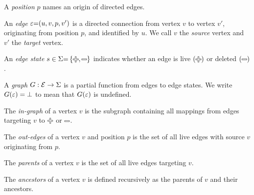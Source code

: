 \begin{definition}
  A \emph{position} $p$ names an origin of directed edges.
\end{definition}

\begin{definition}
  An \emph{edge} $\varepsilon{=}(u, v, p, v^\prime)$ is a directed connection from vertex $v$ to vertex $v'$, originating from position $p$, and identified by $u$.
  We call $v$ the \emph{source} vertex and $v'$ the \emph{target} vertex.
\end{definition}

\begin{definition}
  An \emph{edge state} $s \in \Sigma{=}\SetOf{\Plus, \Minus}$ indicates whether an edge is live $\left(\Plus\right)$ or deleted $\left(\Minus\right)$.
\end{definition}

\begin{definition}
  A \emph{graph} $G : \mathcal{E} \rightarrow \Sigma$ is a partial function from edges to edge states.
  We write $G(\varepsilon) = \bot$ to mean that $G(\varepsilon)$ is undefined.
\end{definition}

\begin{definition}
  The \emph{in-graph} of a vertex $v$ is the subgraph containing all mappings from edges targeting $v$ to $\Plus$ or $\Minus$.
\end{definition}

\begin{definition}
  The \emph{out-edges} of a vertex $v$ and position $p$ is the set of all live edges with source $v$ originating from $p$.
\end{definition}

\begin{definition}
  The \emph{parents} of a vertex $v$ is the set of all live edges targeting $v$.
\end{definition}

\begin{definition}
  The \emph{ancestors} of a vertex $v$ is defined recursively as the parents of $v$ and their ancestors.
\end{definition}


